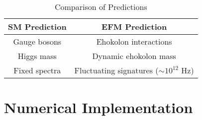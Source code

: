 \documentclass{article}
\begin{document}
\begin{table}[h]
    \centering
    \begin{tabular}{|c|c|}
        \hline
        \textbf{SM Prediction} & \textbf{EFM Prediction} \\
        \hline
        Gauge bosons & Ehokolon interactions \\
        Higgs mass & Dynamic ehokolon mass \\
        Fixed spectra & Fluctuating signatures (\(\sim 10^{12} \text{ Hz}\)) \\
        \hline
    \end{tabular}
    \caption{Comparison of Predictions}
    \label{tab:predictions}
\end{table}

\section{Numerical Implementation}
\end{document}
